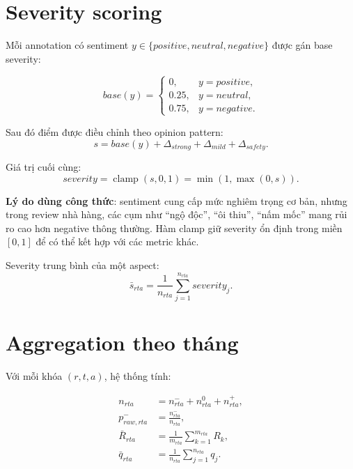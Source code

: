 \documentclass[12pt,a4paper]{article}
\begin{document}
\section{Severity scoring}

Mỗi annotation có sentiment $y \in \{positive, neutral, negative\}$ được gán base severity:

\begin{equation}
base(y)=
\begin{cases}
0, & y=positive,\\
0.25, & y=neutral,\\
0.75, & y=negative.
\end{cases}
\end{equation}

Sau đó điểm được điều chỉnh theo opinion pattern:
\begin{equation}
s = base(y) + \Delta_{strong} + \Delta_{mild} + \Delta_{safety}.
\end{equation}

Giá trị cuối cùng:
\begin{equation}
severity = \operatorname{clamp}(s,0,1)
= \min(1,\max(0,s)).
\end{equation}

\textbf{Lý do dùng công thức}: sentiment cung cấp mức nghiêm trọng cơ bản, nhưng trong review nhà hàng, các cụm như ``ngộ độc'', ``ôi thiu'', ``nấm mốc'' mang rủi ro cao hơn negative thông thường. Hàm clamp giữ severity ổn định trong miền $[0,1]$ để có thể kết hợp với các metric khác.

Severity trung bình của một aspect:
\begin{equation}
\bar{s}_{rta}=\frac{1}{n_{rta}}\sum_{j=1}^{n_{rta}} severity_j.
\end{equation}

\section{Aggregation theo tháng}

Với mỗi khóa $(r,t,a)$, hệ thống tính:

\begin{align}
n_{rta} &= n^{-}_{rta}+n^{0}_{rta}+n^{+}_{rta},\\
p^{-}_{raw,rta} &= \frac{n^{-}_{rta}}{n_{rta}},\\
\bar{R}_{rta} &= \frac{1}{m_{rta}}\sum_{k=1}^{m_{rta}}R_k,\\
\bar{q}_{rta} &= \frac{1}{n_{rta}}\sum_{j=1}^{n_{rta}}q_j.
\end{align}
\end{document}
